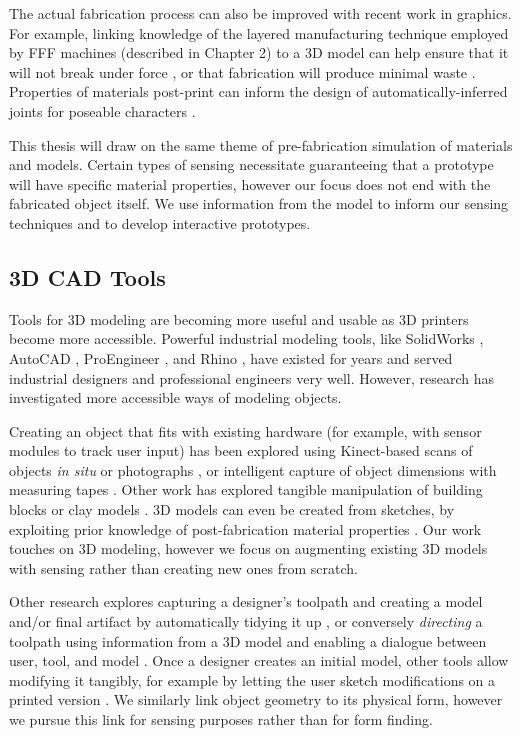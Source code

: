     The actual fabrication process can also be improved with recent work in graphics. For example, linking knowledge of the layered manufacturing technique employed by FFF machines (described in Chapter 2) to a 3D model can help ensure that it will not break under force \cite{umetani-strength}, or that fabrication will produce minimal waste \cite{schmidt-support}. Properties of materials post-print can inform the design of automatically-inferred joints for poseable characters \cite{bacher-posable,cali-articulated}.
    
    This thesis will draw on the same theme of pre-fabrication simulation of materials and models. Certain types of sensing necessitate guaranteeing that a prototype will have specific material properties, however our focus does not end with the fabricated object itself. We use information from the model to inform our sensing techniques and to develop interactive prototypes.
    
\subsection{3D CAD Tools}
    Tools for 3D modeling are becoming more useful and usable as 3D printers become more accessible. Powerful industrial modeling tools, like SolidWorks \cite{solidworks}, AutoCAD \cite{autocad}, ProEngineer \cite{proe}, and Rhino \cite{rhino}, have existed for years and served industrial designers and professional engineers very well. However, research has investigated more accessible ways of modeling objects.
    
    Creating an object that fits with existing hardware (for example, with sensor modules to track user input) has been explored using Kinect-based scans of objects \emph{in situ} \cite{molyneaux-kinectfusion, weichel-mixfab} or photographs \cite{lau-modeling}, or intelligent capture of object dimensions with measuring tapes \cite{lee-handscape,weichel-spata}. Other work has explored tangible manipulation of building blocks \cite{anderson-tangible, gupta-duplotrack} or clay models \cite{savage-mmarks}. 3D models can even be created from sketches, by exploiting prior knowledge of post-fabrication material properties \cite{mori-plushie, saul-sketchchair}. Our work touches on 3D modeling, however we focus on augmenting existing 3D models with sensing rather than creating new ones from scratch.
    
    Other research explores capturing a designer's toolpath and creating a model and/or final artifact by automatically tidying it up \cite{willis-interactive, mueller-constructable, mueller-laserorigami}, or conversely \emph{directing} a toolpath using information from a 3D model and enabling a dialogue between user, tool, and model \cite{zoran-freed}. Once a designer creates an initial model, other tools allow modifying it tangibly, for example by letting the user sketch modifications on a printed version \cite{song-modelcraft-tochi}. We similarly link object geometry to its physical form, however we pursue this link for sensing purposes rather than for form finding.
    
